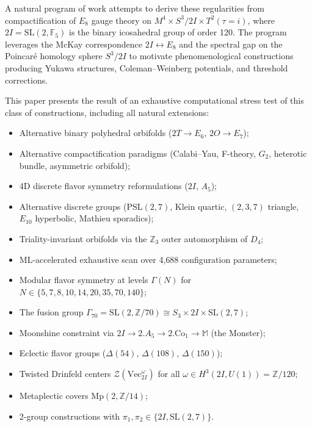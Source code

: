 \documentclass[11pt,a4paper]{amsart}
\theoremstyle{definition}
\theoremstyle{remark}
\newcommand{\SL}{\mathrm{SL}}
\newcommand{\PSL}{\mathrm{PSL}}
\newcommand{\Mp}{\mathrm{Mp}}
\newcommand{\VecCat}{\mathrm{Vec}}
\newcommand{\bbZ}{\mathbb{Z}}
\newcommand{\bbF}{\mathbb{F}}
\begin{document}
A natural program of work attempts to derive these regularities from
compactification of $E_8$ gauge theory on $M^4 \times S^3/2I \times T^2(\tau{=}i)$,
where $2I = \SL(2,\bbF_5)$ is the binary icosahedral group of order 120. The
program leverages the McKay correspondence $2I \leftrightarrow E_8$
\cite{McKay1980} and the spectral gap on the Poincar\'e homology sphere
$S^3/2I$ \cite{Klein1884} to motivate phenomenological constructions producing
Yukawa structures, Coleman--Weinberg potentials, and threshold corrections.

This paper presents the result of an exhaustive computational stress test
of this class of constructions, including all natural extensions:

\begin{itemize}
  \item Alternative binary polyhedral orbifolds ($2T \to E_6$, $2O \to E_7$);
  \item Alternative compactification paradigms (Calabi--Yau, F-theory, $G_2$,
        heterotic bundle, asymmetric orbifold);
  \item 4D discrete flavor symmetry reformulations ($2I$, $A_5$);
  \item Alternative discrete groups ($\PSL(2,7)$, Klein quartic, $(2,3,7)$
        triangle, $E_{10}$ hyperbolic, Mathieu sporadics);
  \item Triality-invariant orbifolds via the $\bbZ_3$ outer automorphism of $D_4$;
  \item ML-accelerated exhaustive scan over 4{,}688 configuration parameters;
  \item Modular flavor symmetry at levels $\Gamma(N)$ for
        $N \in \{5, 7, 8, 10, 14, 20, 35, 70, 140\}$;
  \item The fusion group $\Gamma_{70} = \SL(2,\bbZ/70) \cong S_3 \times 2I \times \SL(2,7)$;
  \item Moonshine constraint via $2I \to 2.A_5 \to 2.\mathrm{Co}_1 \to \mathbb{M}$
        (the Monster);
  \item Eclectic flavor groups ($\Delta(54)$, $\Delta(108)$, $\Delta(150)$);
  \item Twisted Drinfeld centers $\mathcal{Z}(\VecCat_{2I}^\omega)$ for all
        $\omega \in H^3(2I, U(1)) = \bbZ/120$;
  \item Metaplectic covers $\Mp(2,\bbZ/14)$;
  \item 2-group constructions with $\pi_1, \pi_2 \in \{2I, \SL(2,7)\}$.
\end{itemize}
\end{document}
